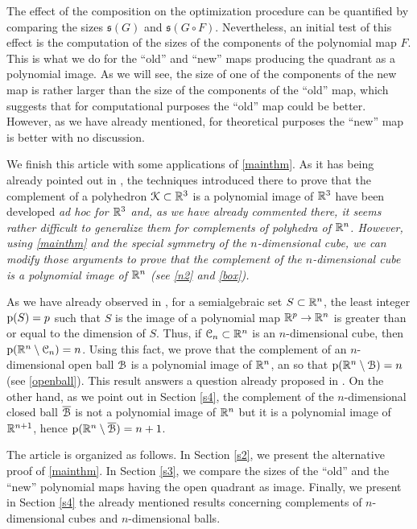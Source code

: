 \documentclass[11pt,a4paper]{amsart}
\theoremstyle{definition}
\theoremstyle{remark}
\newcommand{\pol}{{\EuScript K}}
\newcommand{\ball}{{\EuScript B}}
\newcommand{\cube}{{\EuScript C}}
\newcommand{\size}{\mathfrak{s}}
\newcommand{\ol}{\overline}
\begin{document}
The effect of the composition on the optimization procedure can be quantified by comparing the sizes $\size(G)$ and $\size(G\circ F)$. Nevertheless, an initial test of this effect is the computation of the sizes of the components of the polynomial map $F$. This is what we do for the ``old'' and ``new'' maps producing the quadrant as a polynomial image. As we will see, the size of one of the components of the new map is rather larger than the size of the components of the ``old'' map, which suggests that for computational purposes the ``old'' map could be better. However, as we have already mentioned, for theoretical purposes the ``new'' map is better with no discussion.

We finish this article with some applications of \ref{mainthm}. As it has being already pointed out in \cite{fgu1}, the techniques introduced there to prove that the complement of a polyhedron $\pol\subset\R^3$ is a polynomial image of ${\mathbb R}^3$ have been developed \em ad hoc \em for ${\mathbb R}^3$ and, as we have already commented there, it seems rather difficult to generalize them for complements of polyhedra of ${\mathbb R}^n$. However, using \ref{mainthm} and the special symmetry of the $n$-dimensional cube, we can modify those arguments to prove that the complement of the $n$-dimensional cube is a polynomial image of ${\mathbb R}^n$ (see \ref{n2} and \ref{box}). 

As we have already observed in \cite{fg2}, for a semialgebraic set $S\subset{\mathbb R}^n$, the least integer ${\rm p}(S)=p$ such that $S$ is the image of a polynomial map ${\mathbb R}^p\to{\mathbb R}^n$ is greater than or equal to the dimension of $S$. Thus, if $\cube_n\subset\R^n$ is an $n$-dimensional cube, then ${\rm p}(\R^n\setminus\cube_n)=n$. Using this fact, we prove that the complement of an $n$-dimensional open ball $\ball$ is a polynomial image of ${\mathbb R}^n$, an so that ${\rm p}(\R^n\setminus\ball)=n$ (see \ref{openball}). This result answers a question already proposed in \cite[7.3.3]{fg2}. On the other hand, as we point out in Section \ref{s4}, the complement of the $n$-dimensional closed ball $\ol{\ball}$ is not a polynomial image of ${\mathbb R}^n$ but it is a polynomial image of ${\mathbb R}^{n+1}$, hence ${\rm p}(\R^n\setminus{\ol{\ball}})=n+1$.
 
The article is organized as follows. In Section \ref{s2}, we present the alternative proof of \ref{mainthm}. In Section \ref{s3}, we compare the sizes of the ``old'' and the ``new'' polynomial maps having the open quadrant as image. Finally, we present in Section \ref{s4} the already mentioned results concerning complements of $n$-dimensional cubes and $n$-dimensional balls.
\end{document}

